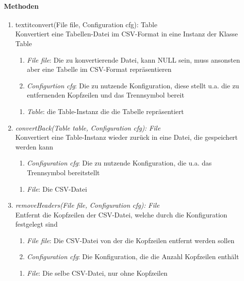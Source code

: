 \paragraph{Methoden}

\begin{enumerate}[+]
	\item textit{convert(File file, Configuration cfg): Table} \\
	Konvertiert eine Tabellen-Datei im CSV-Format in eine Instanz der Klasse Table
	
\begin{enumerate}[$\bullet$]
	\item \textit{File file}: Die zu konvertierende Datei, kann NULL sein, muss ansonsten aber eine Tabelle im CSV-Format repräsentieren
	\item \textit{Configurtion cfg}: Die zu nutzende Konfiguration, diese stellt u.a. die zu entfernenden Kopfzeilen und das Trennsymbol bereit
	\end{enumerate}
	\vspace{-0.2cm}
	\begin{enumerate}[$\circ$]
		\item \textit{Table}: die Table-Instanz die die Tabelle repräsentiert
	\end{enumerate}
	
	\item \textit{convertBack(Table table, Configuration cfg): File} \\
	Konvertiert eine Table-Instanz wieder zurück in eine Datei, die gespeichert werden kann
	\begin{enumerate}[$\bullet$]
		\textit{Table table}: Die zu konvertierende Table-Instanz
		\item \textit{Configuration cfg}: Die zu nutzende Konfiguration, die u.a. das Trennsymbol bereitstellt
	\end{enumerate}
	\vspace{-0.2cm}
	\begin{enumerate}[$\circ$]
		\item \textit{File}: Die CSV-Datei
	\end{enumerate}

	\item \textit{removeHeaders(File file, Configuration cfg): File} \\
	Entfernt die Kopfzeilen der CSV-Datei, welche durch die Konfiguration festgelegt sind
	\begin{enumerate}[$\bullet$]
		\item \textit{File file}: Die CSV-Datei von der die Kopfzeilen entfernt werden sollen
		\item \textit{Configuration cfg}: Die Konfiguration, die die Anzahl Kopfzeilen enthält
	\end{enumerate}
	\vspace{-0.2cm}
	\begin{enumerate}[$\circ$]
		\item \textit{File}: Die selbe CSV-Datei, nur ohne Kopfzeilen
	\end{enumerate}
\end{enumerate}

